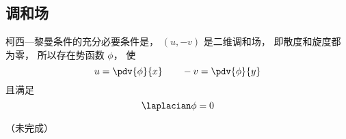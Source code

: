 
\subsection{调和场}

柯西—黎曼条件的充分必要条件是， $(u, -v)$ 是二维调和场， 即散度和旋度都为零， 所以存在势函数 $\phi$， 使
\begin{equation}
u = \pdv{\phi}{x} \qquad -v = \pdv{\phi}{y}
\end{equation}
且满足
\begin{equation}
\laplacian \phi = 0
\end{equation}

（未完成）

